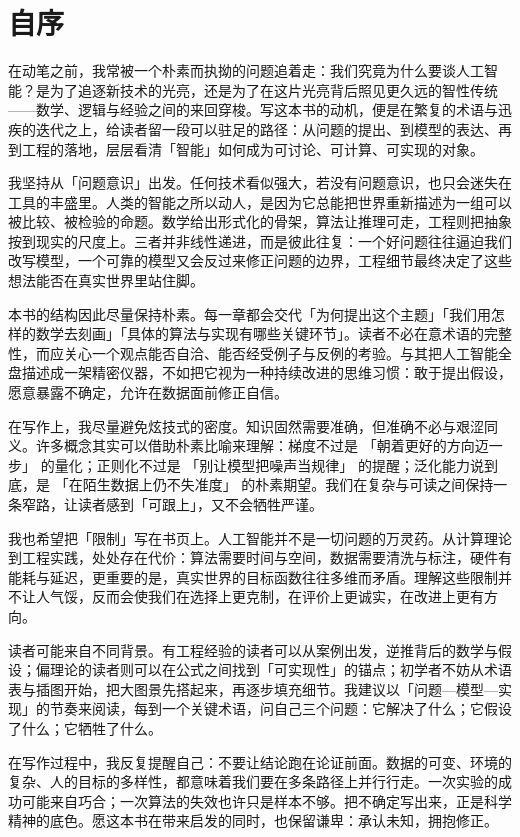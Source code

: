 \chapter*{自序}

在动笔之前，我常被一个朴素而执拗的问题追着走：我们究竟为什么要谈人工智能？是为了追逐新技术的光亮，还是为了在这片光亮背后照见更久远的智性传统——数学、逻辑与经验之间的来回穿梭。写这本书的动机，便是在繁复的术语与迅疾的迭代之上，给读者留一段可以驻足的路径：从问题的提出、到模型的表达、再到工程的落地，层层看清「智能」如何成为可讨论、可计算、可实现的对象。

我坚持从「问题意识」出发。任何技术看似强大，若没有问题意识，也只会迷失在工具的丰盛里。人类的智能之所以动人，是因为它总能把世界重新描述为一组可以被比较、被检验的命题。数学给出形式化的骨架，算法让推理可走，工程则把抽象按到现实的尺度上。三者并非线性递进，而是彼此往复：一个好问题往往逼迫我们改写模型，一个可靠的模型又会反过来修正问题的边界，工程细节最终决定了这些想法能否在真实世界里站住脚。

本书的结构因此尽量保持朴素。每一章都会交代「为何提出这个主题」「我们用怎样的数学去刻画」「具体的算法与实现有哪些关键环节」。读者不必在意术语的完整性，而应关心一个观点能否自洽、能否经受例子与反例的考验。与其把人工智能全盘描述成一架精密仪器，不如把它视为一种持续改进的思维习惯：敢于提出假设，愿意暴露不确定，允许在数据面前修正自信。

在写作上，我尽量避免炫技式的密度。知识固然需要准确，但准确不必与艰涩同义。许多概念其实可以借助朴素比喻来理解：梯度不过是 「朝着更好的方向迈一步」 的量化；正则化不过是 「别让模型把噪声当规律」 的提醒；泛化能力说到底，是 「在陌生数据上仍不失准度」 的朴素期望。我们在复杂与可读之间保持一条窄路，让读者感到「可跟上」，又不会牺牲严谨。

我也希望把「限制」写在书页上。人工智能并不是一切问题的万灵药。从计算理论到工程实践，处处存在代价：算法需要时间与空间，数据需要清洗与标注，硬件有能耗与延迟，更重要的是，真实世界的目标函数往往多维而矛盾。理解这些限制并不让人气馁，反而会使我们在选择上更克制，在评价上更诚实，在改进上更有方向。

读者可能来自不同背景。有工程经验的读者可以从案例出发，逆推背后的数学与假设；偏理论的读者则可以在公式之间找到「可实现性」的锚点；初学者不妨从术语表与插图开始，把大图景先搭起来，再逐步填充细节。我建议以「问题—模型—实现」的节奏来阅读，每到一个关键术语，问自己三个问题：它解决了什么；它假设了什么；它牺牲了什么。

在写作过程中，我反复提醒自己：不要让结论跑在论证前面。数据的可变、环境的复杂、人的目标的多样性，都意味着我们要在多条路径上并行行走。一次实验的成功可能来自巧合；一次算法的失效也许只是样本不够。把不确定写出来，正是科学精神的底色。愿这本书在带来启发的同时，也保留谦卑：承认未知，拥抱修正。

